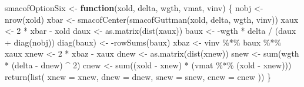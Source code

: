 \documentclass[
  12pt,
  letterpaper,
  DIV=11,
  numbers=noendperiod]{scrartcl}
\newenvironment{Shaded}{\begin{snugshade}}{\end{snugshade}}
\newcommand{\AttributeTok}[1]{\textcolor[rgb]{0.40,0.45,0.13}{#1}}
\newcommand{\ControlFlowTok}[1]{\textcolor[rgb]{0.00,0.23,0.31}{\textbf{#1}}}
\newcommand{\DecValTok}[1]{\textcolor[rgb]{0.68,0.00,0.00}{#1}}
\newcommand{\FunctionTok}[1]{\textcolor[rgb]{0.28,0.35,0.67}{#1}}
\newcommand{\NormalTok}[1]{\textcolor[rgb]{0.00,0.23,0.31}{#1}}
\newcommand{\OtherTok}[1]{\textcolor[rgb]{0.00,0.23,0.31}{#1}}
\newcommand{\SpecialCharTok}[1]{\textcolor[rgb]{0.37,0.37,0.37}{#1}}
\begin{document}
\begin{Shaded}
\begin{Highlighting}[]
\NormalTok{smacofOptionSix }\OtherTok{\textless{}{-}} \ControlFlowTok{function}\NormalTok{(xold, delta, wgth, vmat, vinv) \{}
\NormalTok{  nobj }\OtherTok{\textless{}{-}} \FunctionTok{nrow}\NormalTok{(xold)}
\NormalTok{  xbar }\OtherTok{\textless{}{-}} \FunctionTok{smacofCenter}\NormalTok{(}\FunctionTok{smacofGuttman}\NormalTok{(xold, delta, wgth, vinv))}
\NormalTok{  xaux }\OtherTok{\textless{}{-}} \DecValTok{2} \SpecialCharTok{*}\NormalTok{ xbar }\SpecialCharTok{{-}}\NormalTok{ xold}
\NormalTok{  daux }\OtherTok{\textless{}{-}} \FunctionTok{as.matrix}\NormalTok{(}\FunctionTok{dist}\NormalTok{(xaux))}
\NormalTok{  baux }\OtherTok{\textless{}{-}} \SpecialCharTok{{-}}\NormalTok{wgth }\SpecialCharTok{*}\NormalTok{ delta }\SpecialCharTok{/}\NormalTok{ (daux }\SpecialCharTok{+} \FunctionTok{diag}\NormalTok{(nobj))}
  \FunctionTok{diag}\NormalTok{(baux) }\OtherTok{\textless{}{-}} \SpecialCharTok{{-}}\FunctionTok{rowSums}\NormalTok{(baux)}
\NormalTok{  xbaz }\OtherTok{\textless{}{-}}\NormalTok{ vinv }\SpecialCharTok{\%*\%}\NormalTok{ baux }\SpecialCharTok{\%*\%}\NormalTok{ xaux}
\NormalTok{  xnew }\OtherTok{\textless{}{-}} \DecValTok{2} \SpecialCharTok{*}\NormalTok{ xbaz }\SpecialCharTok{{-}}\NormalTok{ xaux}
\NormalTok{  dnew }\OtherTok{\textless{}{-}} \FunctionTok{as.matrix}\NormalTok{(}\FunctionTok{dist}\NormalTok{(xnew))}
\NormalTok{  snew }\OtherTok{\textless{}{-}} \FunctionTok{sum}\NormalTok{(wgth }\SpecialCharTok{*}\NormalTok{ (delta }\SpecialCharTok{{-}}\NormalTok{ dnew) }\SpecialCharTok{\^{}} \DecValTok{2}\NormalTok{)}
\NormalTok{  cnew }\OtherTok{\textless{}{-}} \FunctionTok{sum}\NormalTok{((xold }\SpecialCharTok{{-}}\NormalTok{ xnew) }\SpecialCharTok{*}\NormalTok{ (vmat }\SpecialCharTok{\%*\%}\NormalTok{ (xold }\SpecialCharTok{{-}}\NormalTok{ xnew)))}
  \FunctionTok{return}\NormalTok{(}\FunctionTok{list}\NormalTok{(}
    \AttributeTok{xnew =}\NormalTok{ xnew,}
    \AttributeTok{dnew =}\NormalTok{ dnew,}
    \AttributeTok{snew =}\NormalTok{ snew,}
    \AttributeTok{cnew =}\NormalTok{ cnew}
\NormalTok{  ))}
\NormalTok{\}}


\end{Highlighting}
\end{Shaded}
\end{document}
